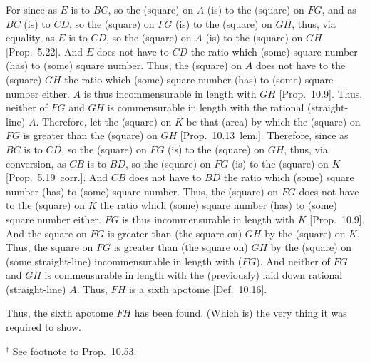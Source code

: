 \begin{Parallel}{}{}
{For since as $E$ is to $BC$, so the (square) on $A$ (is) to the (square)
on $FG$, and as $BC$ (is) to $CD$, so the (square) on $FG$ (is) to
the (square) on $GH$, thus, via equality, as $E$ is to $CD$, so the
(square) on $A$ (is) to the (square) on $GH$ [Prop.~5.22]. And $E$ does not have to $CD$
the ratio which (some) square number (has) to (some) square number.
Thus, the (square) on $A$ does not have to the (square) $GH$ the
ratio which (some) square number (has) to (some) square number either. $A$ is thus incommensurable in length with $GH$ [Prop.~10.9]. Thus, neither of $FG$ and $GH$
is commensurable in length with the rational (straight-line) $A$. Therefore, let the (square)
on $K$ be that (area) by which the (square) on $FG$ is greater than the (square) on $GH$ [Prop.~10.13~lem.].
 Therefore, since as $BC$ is to $CD$, so the (square) on $FG$ (is) to the
(square) on $GH$, thus, via conversion, as $CB$ is to $BD$, so the (square)
on $FG$ (is) to the (square) on $K$ [Prop.~5.19~corr.]. And $CB$ does not have
to $BD$ the ratio which (some) square number (has) to (some) square
number. Thus, the (square) on $FG$ does not have to the (square) on
$K$ the ratio which (some) square number (has) to (some) square number
either. $FG$ is thus incommensurable in length with $K$ [Prop.~10.9]. And the square on $FG$ is greater
than (the square on) $GH$ by the (square) on $K$.
Thus, the square on
$FG$ is greater than (the square on) $GH$ by the (square)
on (some straight-line) incommensurable in length with ($FG$).
And neither of $FG$ and $GH$ is commensurable in length
with the (previously) laid down rational (straight-line) $A$. Thus,
$FH$ is a sixth apotome [Def.~10.16].

Thus, the sixth apotome $FH$ has been found. (Which is) the
very thing it was required to show.}
\end{Parallel}
{\footnotesize\noindent$^\dag$ See footnote to Prop.~10.53.}


